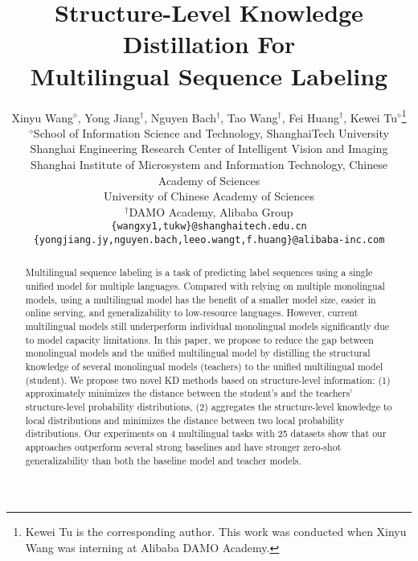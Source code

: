 \documentclass[11pt,a4paper]{article}
\title{{S}tructure-{L}evel {K}nowledge {D}istillation {F}or\\ {M}ultilingual {S}equence {L}abeling}
\author{Xinyu Wang$^{\diamond}$, Yong Jiang$^{\dagger}$, Nguyen Bach$^{\dagger}$, Tao Wang$^{\dagger}$, Fei Huang$^{\dagger}$,  Kewei Tu$^{\diamond}$\thanks{\hspace{1mm} Kewei Tu is the corresponding author. This work was conducted when Xinyu Wang was interning at Alibaba DAMO Academy.} \\
 $^\diamond$School of Information Science and Technology, ShanghaiTech University \\
 Shanghai Engineering Research Center of Intelligent Vision and Imaging \\
 Shanghai Institute of Microsystem and Information Technology, Chinese Academy of Sciences \\
 University of Chinese Academy of Sciences \\
 $^\dagger$DAMO Academy, Alibaba Group \\
  {\tt \{wangxy1,tukw\}@shanghaitech.edu.cn} \\
  {\tt \{yongjiang.jy,nguyen.bach,leeo.wangt,f.huang\}@alibaba-inc.com} \\
 }
\date{}
\begin{document}
\maketitle
\begin{abstract}




Multilingual sequence labeling is a task of predicting label sequences using a single unified model for multiple languages. Compared with relying on multiple monolingual models, using a multilingual model has the benefit of a smaller model size, easier in online serving, and generalizability to low-resource languages. However, current multilingual models still underperform individual monolingual models significantly due to model capacity limitations. In this paper, we propose to reduce the gap between monolingual models and the unified multilingual model by distilling the structural knowledge of several monolingual models (teachers) to the unified multilingual model (student). We propose two novel KD methods based on structure-level information: (1) approximately minimizes the distance between the student's and the teachers' structure-level probability distributions, (2) aggregates the structure-level knowledge to local distributions and minimizes the distance between two local probability distributions. Our experiments on 4 multilingual tasks with 25 datasets show that our approaches outperform several strong baselines and have stronger zero-shot generalizability than both the baseline model and teacher models.
\end{abstract}
\end{document}

